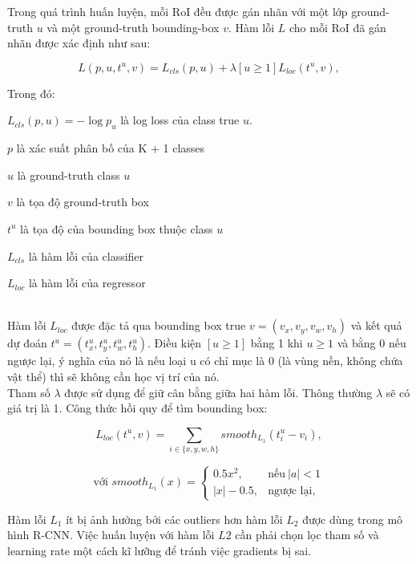 Trong quá trình huấn luyện, mỗi RoI đều được gán nhãn với một lớp ground-truth $\mathbin{u}$ và một ground-truth bounding-box $v$. Hàm lỗi $L$ cho mỗi RoI đã gán nhãn được xác định như sau:
\begin{center}
\begin{equation}
	L(p, u, t^u, v) = L_{cls}(p, u) + \lambda[u\geq 1]{L_{loc}}(t^u, v),
\end{equation}
\end{center}
Trong đó: 

$L_{cls}(p, u) = -\log p_u$ là log loss của class true $u$.

$p$ là xác suất phân bố của K + 1 classes

$u$ là ground-truth class $u$

$v$ là tọa độ ground-truth box

$t^u$ là tọa độ của bounding box thuộc class $u$

$L_{cls}$ là hàm lỗi của classifier

$L_{loc}$ là hàm lỗi của regressor

~\\
Hàm lỗi ${L_{loc}}$ được đặc tả qua bounding box true $v = (v_x, v_y, v_w, v_h)$ và kết quả dự đoán $t^u = (t_x^u, t_y^u, t_w^u, t_h^u)$. Điều kiện $[u\geq 1]$ bằng 1 khi $u \geq 1$ và bằng 0 nếu ngược lại, ý nghĩa của nó là nếu loại u có chỉ mục là 0 (là vùng nền, không chứa vật thể) thì sẽ không cần học vị trí của nó. \\
Tham số $\lambda$ được sử dụng để giữ cân bằng giữa hai hàm lỗi. Thông thường $\lambda$ sẽ có giá trị là 1.
Công thức hồi quy để tìm bounding box:
\begin{center}
\begin{equation}
	L_{loc}(t^u, v) = \sum_{i\in \{ x,y,w,h \}}smooth_{L_1}(t_i^u - v_i),
\end{equation}
\end{center}	
\begin{center}
\begin{equation}
    \text{với } smooth_{L_1}(x)=
    \begin{cases}
      0.5x^2, & \text{nếu}\ |a| < 1 \\
      |x| - 0.5, & \text{ngược lại,}
    \end{cases}
  \end{equation}
\end{center}
Hàm lỗi $L_1$ ít bị ảnh hưởng bởi các outliers hơn hàm lỗi $L_2$ được dùng trong mô hình R-CNN. Việc huấn luyện với hàm lỗi $L2$ cần phải chọn lọc tham số và learning rate một cách kĩ lưỡng để tránh việc gradients bị sai.
